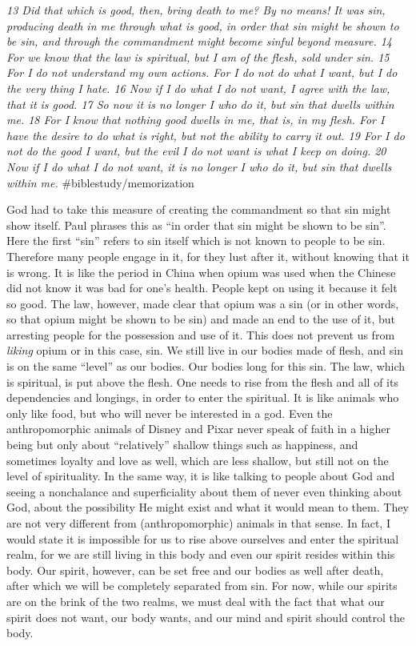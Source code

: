 \emph{13 Did that which is good, then, bring death to me? By no means!
It was sin, producing death in me through what is good, in order that
sin might be shown to be sin, and through the commandment might become
sinful beyond measure. 14 For we know that the law is spiritual, but I
am of the flesh, sold under sin. 15 For I do not understand my own
actions. For I do not do what I want, but I do the very thing I hate. 16
Now if I do what I do not want, I agree with the law, that it is good.
17 So now it is no longer I who do it, but sin that dwells within me. 18
For I know that nothing good dwells in me, that is, in my flesh. For I
have the desire to do what is right, but not the ability to carry it
out. 19 For I do not do the good I want, but the evil I do not want is
what I keep on doing. 20 Now if I do what I do not want, it is no longer
I who do it, but sin that dwells within me.} \#biblestudy/memorization

God had to take this measure of creating the commandment so that sin
might show itself. Paul phrases this as ``in order that sin might be
shown to be sin''. Here the first ``sin'' refers to sin itself which is
not known to people to be sin. Therefore many people engage in it, for
they lust after it, without knowing that it is wrong. It is like the
period in China when opium was used when the Chinese did not know it was
bad for one's health. People kept on using it because it felt so good.
The law, however, made clear that opium was a sin (or in other words, so
that opium might be shown to be sin) and made an end to the use of it,
but arresting people for the possession and use of it. This does not
prevent us from \emph{liking} opium or in this case, sin. We still live
in our bodies made of flesh, and sin is on the same ``level'' as our
bodies. Our bodies long for this sin. The law, which is spiritual, is
put above the flesh. One needs to rise from the flesh and all of its
dependencies and longings, in order to enter the spiritual. It is like
animals who only like food, but who will never be interested in a god.
Even the anthropomorphic animals of Disney and Pixar never speak of
faith in a higher being but only about ``relatively'' shallow things
such as happiness, and sometimes loyalty and love as well, which are
less shallow, but still not on the level of spirituality. In the same
way, it is like talking to people about God and seeing a nonchalance and
superficiality about them of never even thinking about God, about the
possibility He might exist and what it would mean to them. They are not
very different from (anthropomorphic) animals in that sense. In fact, I
would state it is impossible for us to rise above ourselves and enter
the spiritual realm, for we are still living in this body and even our
spirit resides within this body. Our spirit, however, can be set free
and our bodies as well after death, after which we will be completely
separated from sin. For now, while our spirits are on the brink of the
two realms, we must deal with the fact that what our spirit does not
want, our body wants, and our mind and spirit should control the body.

